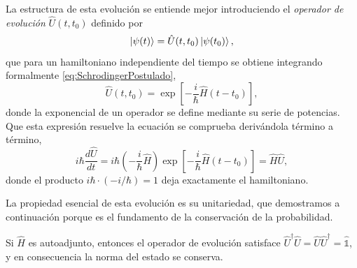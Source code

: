         La estructura de esta evolución se entiende mejor introduciendo el \textit{operador de evolución} $\hat{U}(t,t_{0})$ definido por
        \begin{equation}\label{eq:OperadorEvolucion}
            \ket{\psi(t)} = \hat{U}(t,t_{0})\ket{\psi(t_{0})},
        \end{equation}
        que para un hamiltoniano independiente del tiempo se obtiene integrando formalmente \eqref{eq:SchrodingerPostulado},
        \begin{equation}\label{eq:ExponencialEvolucion}
            \hat{U}(t,t_{0}) = \exp\left[-\frac{i}{\hbar}\hat{H}\left(t-t_{0}\right)\right],
        \end{equation}
        donde la exponencial de un operador se define mediante su serie de potencias. Que esta expresión resuelve la ecuación se comprueba derivándola término a término,
        \begin{equation}\label{eq:VerificacionU}
            i\hbar\frac{d\hat{U}}{dt} = i\hbar\left(-\frac{i}{\hbar}\hat{H}\right)\exp\left[-\frac{i}{\hbar}\hat{H}(t-t_{0})\right] = \hat{H}\hat{U},
        \end{equation}
        donde el producto $i\hbar\cdot(-i/\hbar) = 1$ deja exactamente el hamiltoniano.

        La propiedad esencial de esta evolución es su unitariedad, que demostramos a continuación porque es el fundamento de la conservación de la probabilidad.

        \begin{myteo}\label{teo:Unitariedad}
            Si $\hat{H}$ es autoadjunto, entonces el operador de evolución satisface $\hat{U}^{\dagger}\hat{U} = \hat{U}\hat{U}^{\dagger} = \hat{\mathbb{1}}$, y en consecuencia la norma del estado se conserva.
        \end{myteo}

